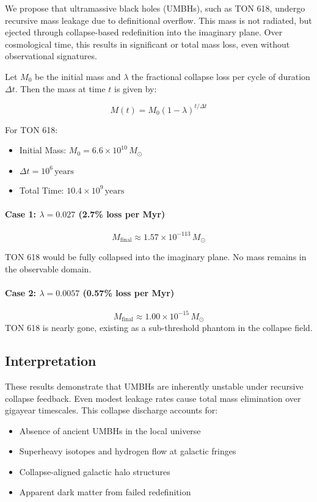 We propose that ultramassive black holes (UMBHs), such as TON 618, undergo recursive mass leakage due to definitional overflow. This mass is not radiated, but ejected through collapse-based redefinition into the imaginary plane. Over cosmological time, this results in significant or total mass loss, even without observational signatures.

Let \( M_0 \) be the initial mass and \( \lambda \) the fractional collapse loss per cycle of duration \( \Delta t \). Then the mass at time \( t \) is given by:

\[
M(t) = M_0 (1 - \lambda)^{t / \Delta t}
\]

For TON 618:
\begin{itemize}
    \item Initial Mass: \( M_0 = 6.6 \times 10^{10} \, M_\odot \)
    \item \( \Delta t = 10^6 \, \text{years} \)
    \item Total Time: \( 10.4 \times 10^9 \, \text{years} \)
\end{itemize}

\paragraph{Case 1: \( \lambda = 0.027 \) (2.7\% loss per Myr)}

\[
M_{\text{final}} \approx 1.57 \times 10^{-113} \, M_\odot
\]

TON 618 would be fully collapsed into the imaginary plane. No mass remains in the observable domain.

\paragraph{Case 2: \( \lambda = 0.0057 \) (0.57\% loss per Myr)}
\[
M_{\text{final}} \approx 1.00 \times 10^{-15} \, M_\odot
\]
TON 618 is nearly gone, existing as a sub-threshold phantom in the collapse field.

\subsection{Interpretation}

These results demonstrate that UMBHs are inherently unstable under recursive collapse feedback. Even modest leakage rates cause total mass elimination over gigayear timescales. This collapse discharge accounts for:

\begin{itemize}
    \item Absence of ancient UMBHs in the local universe
    \item Superheavy isotopes and hydrogen flow at galactic fringes
    \item Collapse-aligned galactic halo structures
    \item Apparent dark matter from failed redefinition
\end{itemize}


